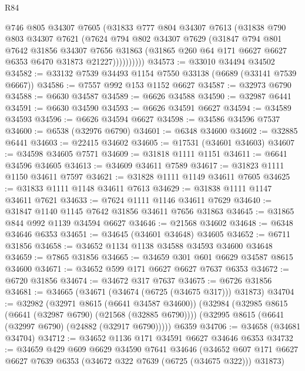 \begin{lexlean}{R84}
\begin{coremodule}
              @746
              @805
              @34307
              @7605
              (@31833
                @777
                @804
                @34307
                @7613
                (@31838
                  @790
                  @803
                  @34307
                  @7621
                  (@7624
                    @794
                    @802
                    @34307
                    @7629
                    (@31847
                      @794
                      @801
                      @7642
                      @31856
                      @34307
                      @7656
                      @31863
                      (@31865 @260 @64 @171 @6627 @6627 @6353 @6470 @31873 @21227))))))))))
@34573 := @33010 @34494 @34502
@34582 := @33132 @7539 @34493 @1154 @7550 @33138 (@6689 (@33141 @7539 @6667))
@34586 := @7557 @992 @153 @1152 @6627
@34587 := @32973 @6790
@34588 := @6630 @34587
@34589 := @6626 @34588
@34590 := @32987 @6441
@34591 := @6630 @34590
@34593 := @6626 @34591 @6627
@34594 := @34589 @34593
@34596 := @6626 @34594 @6627
@34598 := @34586 @34596 @7537
@34600 := @6538 (@32976 @6790)
@34601 := @6348 @34600
@34602 := @32885 @6441
@34603 := @22415 @34602
@34605 := @17531 (@34601 @34603)
@34607 := @34598 @34605 @7571
@34609 := @31818 @1111 @1151
@34611 := @6641 @34596 @34605
@34613 := @34609 @34611 @7589
@34617 := @31823 @1111 @1150 @34611 @7597
@34621 := @31828 @1111 @1149 @34611 @7605
@34625 := @31833 @1111 @1148 @34611 @7613
@34629 := @31838 @1111 @1147 @34611 @7621
@34633 := @7624 @1111 @1146 @34611 @7629
@34640 := @31847 @1140 @1145 @7642 @31856 @34611 @7656 @31863
@34645 := @31865 @844 @992 @1139 @34594 @6627
@34646 := @21568 @34602
@34648 := @6348 @34646 @6353
@34651 := @34645 (@34601 @34648) @34605
@34652 := @6711 @31856
@34658 := @34652 @1134 @1138 @34588 @34593 @34600 @34648
@34659 := @7865 @31856
@34665 := @34659 @301 @601 @6629 @34587 @8615 @34600
@34671 := @34652 @599 @171 @6627 @6627 @7637 @6353
@34672 := @6720 @31856
@34674 := @34672 @317 @7637
@34675 := @6726 @31856
@34681 := @34665 (@34671 (@34674 (@6725 (@34675 @317))) @31873)
@34704 := @32982
    (@32971 @8615 (@6641 @34587 @34600))
    (@32984
      (@32985 @8615 (@6641 (@32987 @6790) (@21568 (@32885 @6790))))
      (@32995 @8615 (@6641 (@32997 @6790) (@24882 (@32917 @6790)))))
    @6359
@34706 := @34658 (@34681 @34704)
@34712 := @34652 @1136 @171 @34591 @6627 @34646 @6353
@34732 := @34659
    @429
    @609
    @6629
    @34590
    @7641
    @34646
    (@34652 @607 @171 @6627 @6627 @7639 @6353 (@34672 @322 @7639 (@6725 (@34675 @322))) @31873)

\end{coremodule}
\end{lexlean}

